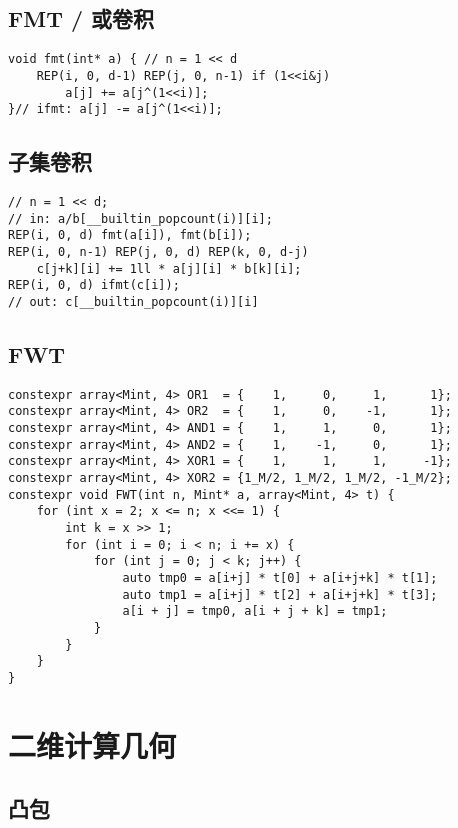 \documentclass[a4paper,landscape,twocolumn]{ctexart}
\begin{document}
\subsection{FMT / 或卷积}

\begin{lstlisting}
void fmt(int* a) { // n = 1 << d
	REP(i, 0, d-1) REP(j, 0, n-1) if (1<<i&j)
		a[j] += a[j^(1<<i)];
}// ifmt: a[j] -= a[j^(1<<i)];
\end{lstlisting}

\subsection{子集卷积}

\begin{lstlisting}
// n = 1 << d;
// in: a/b[__builtin_popcount(i)][i];
REP(i, 0, d) fmt(a[i]), fmt(b[i]);
REP(i, 0, n-1) REP(j, 0, d) REP(k, 0, d-j)
	c[j+k][i] += 1ll * a[j][i] * b[k][i];
REP(i, 0, d) ifmt(c[i]);
// out: c[__builtin_popcount(i)][i]
\end{lstlisting}

\subsection{FWT}

\begin{lstlisting}
constexpr array<Mint, 4> OR1  = {    1,     0,     1,      1};
constexpr array<Mint, 4> OR2  = {    1,     0,    -1,      1};
constexpr array<Mint, 4> AND1 = {    1,     1,     0,      1};
constexpr array<Mint, 4> AND2 = {    1,    -1,     0,      1};
constexpr array<Mint, 4> XOR1 = {    1,     1,     1,     -1};
constexpr array<Mint, 4> XOR2 = {1_M/2, 1_M/2, 1_M/2, -1_M/2};
constexpr void FWT(int n, Mint* a, array<Mint, 4> t) {
	for (int x = 2; x <= n; x <<= 1) {
		int k = x >> 1;
		for (int i = 0; i < n; i += x) {
			for (int j = 0; j < k; j++) {
				auto tmp0 = a[i+j] * t[0] + a[i+j+k] * t[1];
				auto tmp1 = a[i+j] * t[2] + a[i+j+k] * t[3];
				a[i + j] = tmp0, a[i + j + k] = tmp1;
			}
		}
	}
}
\end{lstlisting}

\section{二维计算几何}

\subsection{凸包}
\end{document}

